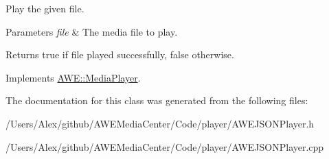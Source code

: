 Play the given file. 


\begin{DoxyParams}{Parameters}
{\em file} & The media file to play.\\
\hline
\end{DoxyParams}
\begin{DoxyReturn}{Returns}
{\ttfamily true} if {\ttfamily file} played successfully, {\ttfamily false} otherwise. 
\end{DoxyReturn}


Implements \hyperlink{class_a_w_e_1_1_media_player_a8a7660cdf7306adf61a7c79831ee7171}{A\-W\-E\-::\-Media\-Player}.



The documentation for this class was generated from the following files\-:\begin{DoxyCompactItemize}
\item 
/\-Users/\-Alex/github/\-A\-W\-E\-Media\-Center/\-Code/player/A\-W\-E\-J\-S\-O\-N\-Player.\-h\item 
/\-Users/\-Alex/github/\-A\-W\-E\-Media\-Center/\-Code/player/A\-W\-E\-J\-S\-O\-N\-Player.\-cpp\end{DoxyCompactItemize}
